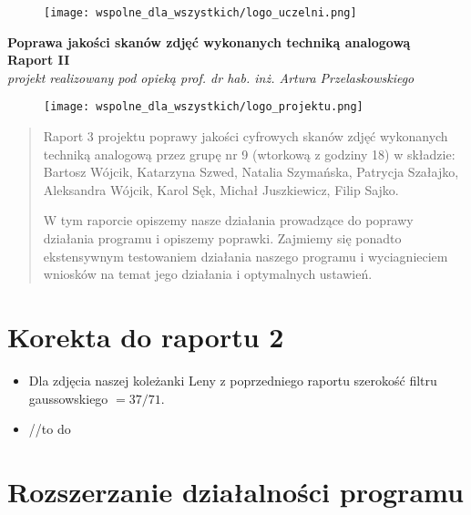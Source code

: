 \documentclass[]{mwart}
\begin{document}
\thispagestyle{empty}

\begin{figure}[h]
    \centering
    \texttt{[image: wspolne\_dla\_wszystkich/logo\_uczelni.png]}
\end{figure}


\begin{center}
    {\LARGE \textbf{Poprawa jakości skanów zdjęć wykonanych techniką analogową
        }} \\[0.3cm]
    {\large \textbf{Raport II}} \\[0.2cm]
    \textit{projekt realizowany pod opieką prof. dr hab. inż. Artura Przelaskowskiego}

\end{center}

\begin{figure}[h]
    \centering
    \texttt{[image: wspolne\_dla\_wszystkich/logo\_projektu.png]}
\end{figure}

\vfill
\begin{abstract}
    Raport 3 projektu poprawy jakości cyfrowych skanów zdjęć wykonanych techniką analogową przez grupę nr 9 (wtorkową z godziny 18)
    w składzie:  Bartosz Wójcik, Katarzyna Szwed, Natalia Szymańska,
    Patrycja Szałajko, Aleksandra Wójcik, Karol Sęk, Michał Juszkiewicz, Filip Sajko.

    W tym raporcie opiszemy nasze działania prowadzące do poprawy działania programu i opiszemy poprawki.
    Zajmiemy się ponadto ekstensywnym testowaniem działania naszego programu i wyciagnieciem wniosków na temat jego działania i optymalnych ustawień.
\end{abstract}

\newpage
\tableofcontents{}

\newpage

\section{Korekta do raportu 2}
\begin{itemize}
    \item Dla zdjęcia naszej koleżanki Leny z poprzedniego raportu szerokość filtru gaussowskiego $ =  37/71$.
    \item //to do
\end{itemize}


\section{Rozszerzanie działalności programu}
\end{document}
